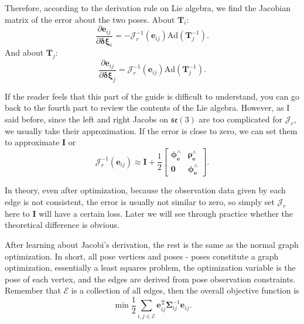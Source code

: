 Therefore, according to the derivation rule on Lie algebra, we find the Jacobian matrix of the error about the two poses. About $\bm{T}_i$:
\begin{equation}
\frac{\partial \bm{e}_{ij}}{\partial \bm{\delta \xi}_i} = - \bm{\mathcal{J}}_r^{-1}(\bm{e}_{ij}) \mathrm{Ad}(\bm{T}_j^{-1}).
\end{equation}
And about $\bm{T}_j$:
\begin{equation}
\frac{\partial \bm{e}_{ij}}{\partial \bm{\delta \xi}_j} = \bm{\mathcal{J}}_r^{-1}(\bm{e}_{ij}) \mathrm{Ad}(\bm{T}_j^{-1}).
\end{equation}

If the reader feels that this part of the guide is difficult to understand, you can go back to the fourth part to review the contents of the Lie algebra. However, as I said before, since the left and right Jacobs on $\mathfrak{se}(3)$ are too complicated for $\bm{\mathcal{J}}_r$, we usually take their approximation. If the error is close to zero, we can set them to approximate $\bm{I}$ or
\begin{equation}
\bm{\mathcal{J}}_r^{-1}(\bm{e}_{ij}) \approx \bm{I} + \frac{1}{2} 
\left[ 
{\begin{array}{*{20}{c}}
	{{\bm{\phi}_{\bm{e}} ^ \wedge }}&{{\bm{\rho}_{\bm{e}} ^ \wedge }}\\
	{\bm{0}}&{{\bm{\phi}_{\bm{e}} ^ \wedge }}
\end{array}} 
\right].
\end{equation}

In theory, even after optimization, because the observation data given by each edge is not consistent, the error is usually not similar to zero, so simply set $\bm{\mathcal{J}}_r$ here to $\bm{I}$ will have a certain loss. Later we will see through practice whether the theoretical difference is obvious.

After learning about Jacobi's derivation, the rest is the same as the normal graph optimization. In short, all pose vertices and poses - poses constitute a graph optimization, essentially a least squares problem, the optimization variable is the pose of each vertex, and the edges are derived from pose observation constraints. Remember that $\mathcal{E}$ is a collection of all edges, then the overall objective function is
\begin{equation}
\mathop {\min }\limits \frac{1}{2}\sum\limits_{i,j \in \mathcal{E}} \bm{e}_{ij}^\mathrm{T} \bm{\Sigma}_{ij}^{-1} \bm{e}_{ij}.
\end{equation}

